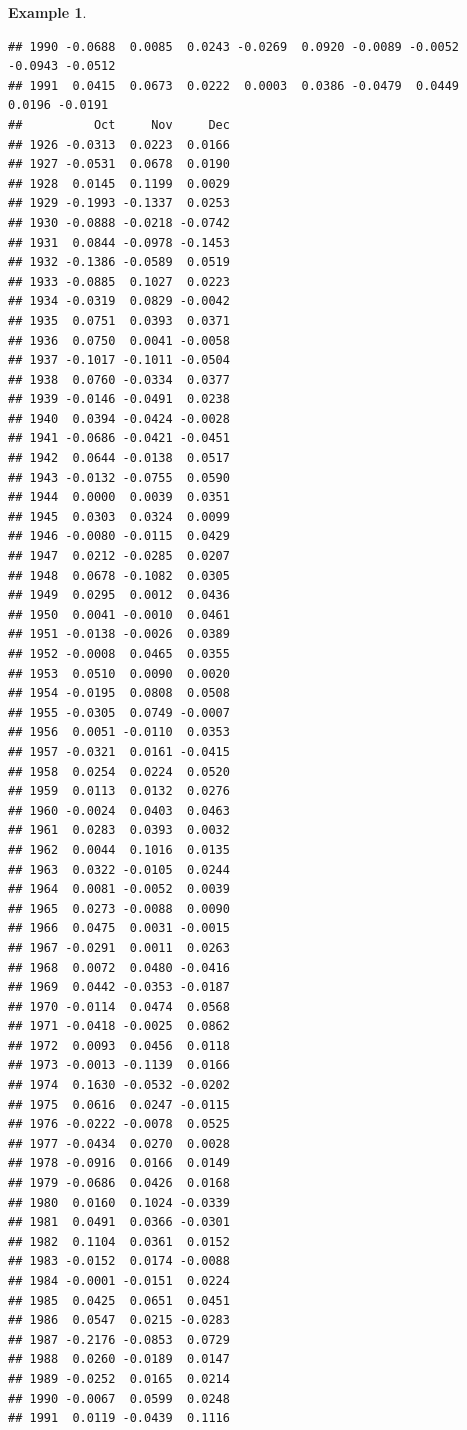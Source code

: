 \documentclass[
]{book}
\theoremstyle{definition}
\theoremstyle{definition}
\newtheorem{example}{Example}[chapter]
\theoremstyle{definition}
\theoremstyle{definition}
\theoremstyle{remark}
\begin{document}
\begin{example}
\begin{verbatim}
## 1990 -0.0688  0.0085  0.0243 -0.0269  0.0920 -0.0089 -0.0052 -0.0943 -0.0512
## 1991  0.0415  0.0673  0.0222  0.0003  0.0386 -0.0479  0.0449  0.0196 -0.0191
##          Oct     Nov     Dec
## 1926 -0.0313  0.0223  0.0166
## 1927 -0.0531  0.0678  0.0190
## 1928  0.0145  0.1199  0.0029
## 1929 -0.1993 -0.1337  0.0253
## 1930 -0.0888 -0.0218 -0.0742
## 1931  0.0844 -0.0978 -0.1453
## 1932 -0.1386 -0.0589  0.0519
## 1933 -0.0885  0.1027  0.0223
## 1934 -0.0319  0.0829 -0.0042
## 1935  0.0751  0.0393  0.0371
## 1936  0.0750  0.0041 -0.0058
## 1937 -0.1017 -0.1011 -0.0504
## 1938  0.0760 -0.0334  0.0377
## 1939 -0.0146 -0.0491  0.0238
## 1940  0.0394 -0.0424 -0.0028
## 1941 -0.0686 -0.0421 -0.0451
## 1942  0.0644 -0.0138  0.0517
## 1943 -0.0132 -0.0755  0.0590
## 1944  0.0000  0.0039  0.0351
## 1945  0.0303  0.0324  0.0099
## 1946 -0.0080 -0.0115  0.0429
## 1947  0.0212 -0.0285  0.0207
## 1948  0.0678 -0.1082  0.0305
## 1949  0.0295  0.0012  0.0436
## 1950  0.0041 -0.0010  0.0461
## 1951 -0.0138 -0.0026  0.0389
## 1952 -0.0008  0.0465  0.0355
## 1953  0.0510  0.0090  0.0020
## 1954 -0.0195  0.0808  0.0508
## 1955 -0.0305  0.0749 -0.0007
## 1956  0.0051 -0.0110  0.0353
## 1957 -0.0321  0.0161 -0.0415
## 1958  0.0254  0.0224  0.0520
## 1959  0.0113  0.0132  0.0276
## 1960 -0.0024  0.0403  0.0463
## 1961  0.0283  0.0393  0.0032
## 1962  0.0044  0.1016  0.0135
## 1963  0.0322 -0.0105  0.0244
## 1964  0.0081 -0.0052  0.0039
## 1965  0.0273 -0.0088  0.0090
## 1966  0.0475  0.0031 -0.0015
## 1967 -0.0291  0.0011  0.0263
## 1968  0.0072  0.0480 -0.0416
## 1969  0.0442 -0.0353 -0.0187
## 1970 -0.0114  0.0474  0.0568
## 1971 -0.0418 -0.0025  0.0862
## 1972  0.0093  0.0456  0.0118
## 1973 -0.0013 -0.1139  0.0166
## 1974  0.1630 -0.0532 -0.0202
## 1975  0.0616  0.0247 -0.0115
## 1976 -0.0222 -0.0078  0.0525
## 1977 -0.0434  0.0270  0.0028
## 1978 -0.0916  0.0166  0.0149
## 1979 -0.0686  0.0426  0.0168
## 1980  0.0160  0.1024 -0.0339
## 1981  0.0491  0.0366 -0.0301
## 1982  0.1104  0.0361  0.0152
## 1983 -0.0152  0.0174 -0.0088
## 1984 -0.0001 -0.0151  0.0224
## 1985  0.0425  0.0651  0.0451
## 1986  0.0547  0.0215 -0.0283
## 1987 -0.2176 -0.0853  0.0729
## 1988  0.0260 -0.0189  0.0147
## 1989 -0.0252  0.0165  0.0214
## 1990 -0.0067  0.0599  0.0248
## 1991  0.0119 -0.0439  0.1116
\end{verbatim}


\end{example}
\end{document}
